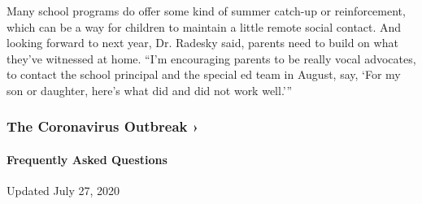 Many school programs do offer some kind of summer catch-up or
reinforcement, which can be a way for children to maintain a little
remote social contact. And looking forward to next year, Dr. Radesky
said, parents need to build on what they've witnessed at home. ``I'm
encouraging parents to be really vocal advocates, to contact the school
principal and the special ed team in August, say, `For my son or
daughter, here's what did and did not work well.'''

\href{https://www.nytimes3xbfgragh.onion/news-event/coronavirus?action=click\&pgtype=Article\&state=default\&region=MAIN_CONTENT_3\&context=storylines_faq}{}

\hypertarget{the-coronavirus-outbreak-}{%
\subsubsection{The Coronavirus Outbreak
›}\label{the-coronavirus-outbreak-}}

\hypertarget{frequently-asked-questions}{%
\paragraph{Frequently Asked
Questions}\label{frequently-asked-questions}}

Updated July 27, 2020

